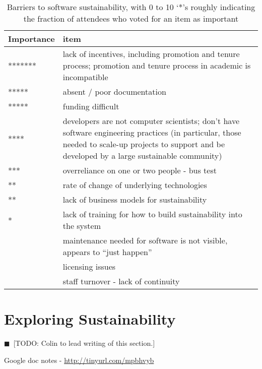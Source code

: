 \documentclass[11pt, oneside]{amsart}
\newcommand{\todo}[1]{{\color{blue}$\blacksquare$~\textsf{[TODO: #1]}}}
\begin{document}
\begin{table*}[ht]
\begin{center}
\caption{Barriers to software sustainability, with 0 to 10 `*'s roughly
indicating the fraction of attendees who voted for an item as important}
    \begin{scriptsize}
    \begin{tabular}{ | p{1.65cm} | p{10.0cm} |}
    \hline
  Importance & item \\ \hline \hline
******* & lack of incentives, including promotion and tenure process; promotion
and tenure process in academic is incompatible \\ \hline
*****  & absent / poor documentation \\ \hline
***** & funding difficult \\ \hline
**** & developers are not computer scientists; don't have software engineering
practices (in particular, those needed to scale-up projects to support and be
developed by a large sustainable community) \\ \hline
*** & overreliance on one or two people - bus test \\ \hline
** & rate of change of underlying technologies \\ \hline
** & lack of business models for sustainability \\ \hline
* & lack of training for how to build sustainability into the system \\ \hline
 & maintenance needed for software is not visible, appears to ``just happen'' \\ \hline
 & licensing issues \\ \hline
 & staff turnover - lack of continuity \\ \hline
    \end{tabular}
    \end{scriptsize}
    \label{tb:software_sustainability_barriers}
\end{center}   
\end{table*} 


\section{Exploring Sustainability}
\todo{Colin to lead writing of this section.}

Google doc notes - \url{http://tinyurl.com/mpbhvyb}
\end{document}
